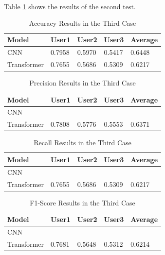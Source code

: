 Table \ref{table:results_third_case_acc} shows the results of the second test.

\begin{table}[H]
    \centering
    \caption{Accuracy Results in the Third Case}
    \label{table:results_third_case_acc}
    \begin{tabular}{|l|l|l|l|l|}
        \hline
        Model & User1 & User2 & User3 & Average \\
        \hline
        CNN & 0.7958 & 0.5970 & 0.5417 & 0.6448 \\
        \hline
        Transformer & 0.7655 & 0.5686 & 0.5309 & 0.6217 \\
        \hline
    \end{tabular}
\end{table}

\begin{table}[H]
    \centering
    \caption{Precision Results in the Third Case}
    \label{table:results_third_case_precision}
    \begin{tabular}{|l|l|l|l|l|}
        \hline
        Model & User1 & User2 & User3 & Average \\
        \hline
        CNN & & & & \\
        \hline
        Transformer & 0.7808 & 0.5776 & 0.5553 & 0.6371 \\
        \hline
    \end{tabular}
\end{table}

\begin{table}[H]
    \centering
    \caption{Recall Results in the Third Case}
    \label{table:results_third_case_recall}
    \begin{tabular}{|l|l|l|l|l|}
        \hline
        Model & User1 & User2 & User3 & Average \\
        \hline
        CNN & & & & \\
        \hline
        Transformer & 0.7655 & 0.5686 & 0.5309 & 0.6217 \\
        \hline
    \end{tabular}
\end{table}

\begin{table}[H]
    \centering
    \caption{F1-Score Results in the Third Case}
    \label{table:results_third_case_f1_score}
    \begin{tabular}{|l|l|l|l|l|}
        \hline
        Model & User1 & User2 & User3 & Average \\
        \hline
        CNN & & & & \\
        \hline
        Transformer & 0.7681 & 0.5648 & 0.5312 & 0.6214 \\
        \hline
    \end{tabular}
\end{table}

